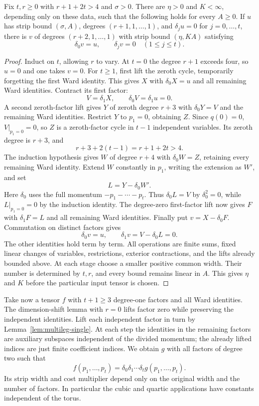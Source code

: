 \begin{lemma}\label{lem:multileg-shift}
Fix $t,r\ge0$ with $r+1+2t>4$ and $\sigma>0$.
There are $\eta>0$ and $K<\infty$, depending only on these data,
such that the following holds for every $A\ge0$.
If $u$ has strip bound $(\sigma,A)$, degrees
$(r+1,1,\ldots,1)$, and $\delta_j u=0$ for $j=0,\ldots,t$,
there is $v$ of degrees $(r+2,1,\ldots,1)$ with strip bound
$(\eta,KA)$ satisfying
\[
                 \delta_0v=u,\qquad \delta_jv=0\quad(1\le j\le t).
\]
\end{lemma}
\begin{proof}
Induct on $t$, allowing $r$ to vary. At $t=0$ the degree $r+1$
exceeds four, so $u=0$ and one takes $v=0$.
For $t\ge1$, first lift the zeroth cycle, temporarily forgetting
the first Ward identity. This gives $X$ with $\delta_0X=u$
and all remaining Ward identities. Contract its first factor:
\[
                  V=\delta_1X,\qquad \delta_0V=\delta_1u=0.
\]
A second zeroth-factor lift gives $Y$ of zeroth degree $r+3$
with $\delta_0Y=V$ and the remaining Ward identities.
Restrict $Y$ to $p_1=0$, obtaining $Z$. Since $q(0)=0$,
$V|_{p_1=0}=0$, so $Z$ is a zeroth-factor cycle in $t-1$
independent variables. Its zeroth degree is $r+3$, and
\[
                  r+3+2(t-1)=r+1+2t>4.
\]
The induction hypothesis gives $W$ of degree $r+4$ with
$\delta_0W=Z$, retaining every remaining Ward identity.
Extend $W$ constantly in $p_1$, writing the extension as $W'$,
and set
\[
                         L=Y-\delta_0W'.
\]
Here $\delta_0$ uses the full momentum $-p_1-\cdots-p_t$.
Thus $\delta_0L=V$ by $\delta_0^2=0$, while $L|_{p_1=0}=0$
by the induction identity. The degree-zero first-factor lift
now gives $F$ with $\delta_1F=L$ and all remaining Ward
identities. Finally put $v=X-\delta_0F$. Commutation on distinct
factors gives
\[
 \delta_0v=u,\qquad
 \delta_1v=V-\delta_0L=0.
\]
The other identities hold term by term. All operations are finite
sums, fixed linear changes of variables, restrictions, exterior
contractions, and the lifts already bounded above. At each stage
choose a smaller positive common width. Their number is determined
by $t,r$, and every bound remains linear in $A$. This gives $\eta$
and $K$ before the particular input tensor is chosen.
\end{proof}

Take now a tensor $f$ with $t+1\ge3$ degree-one factors and all
Ward identities. The dimension-shift lemma with $r=0$ lifts
factor zero while preserving the independent identities. Lift
each independent factor in turn by Lemma~\ref{lem:multileg-single}.
At each step the identities in the remaining factors are auxiliary
subspaces independent of the divided momentum; the already lifted
indices are just finite coefficient indices. We obtain $g$ with
all factors of degree two such that
\begin{equation}\label{eq:multileg-all-curls}
 f(p_1,\ldots,p_t)=\delta_0\delta_1\cdots\delta_t
                           g(p_1,\ldots,p_t).
\end{equation}
Its strip width and cost multiplier depend only on the original
width and the number of factors. In particular the cubic and
quartic applications have constants independent of the torus.

